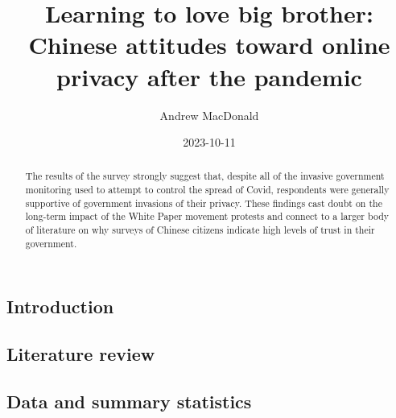 \documentclass[
  letterpaper,
  DIV=11,
  numbers=noendperiod]{scrartcl}
\title{Learning to love big brother: Chinese attitudes toward online
privacy after the pandemic}
\author{Andrew MacDonald}
\date{2023-10-11}
\begin{document}
\maketitle
\begin{abstract}
The results of the survey strongly suggest that, despite all of the
invasive government monitoring used to attempt to control the spread of
Covid, respondents were generally supportive of government invasions of
their privacy. These findings cast doubt on the long-term impact of the
White Paper movement protests and connect to a larger body of literature
on why surveys of Chinese citizens indicate high levels of trust in
their government.
\end{abstract}
\ifdefined\Shaded\renewenvironment{Shaded}{\begin{tcolorbox}[frame hidden, boxrule=0pt, sharp corners, enhanced, borderline west={3pt}{0pt}{shadecolor}, breakable, interior hidden]}{\end{tcolorbox}}\fi

\hypertarget{introduction}{%
\subsection{Introduction}\label{introduction}}

\hypertarget{literature-review}{%
\subsection{Literature review}\label{literature-review}}

\hypertarget{sec-datasummary}{%
\subsection{Data and summary statistics}\label{sec-datasummary}}
\end{document}
